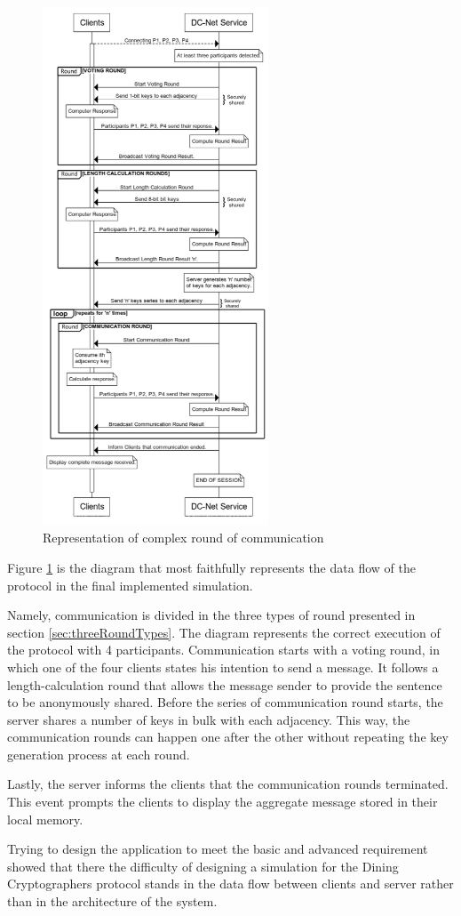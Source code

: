 \begin{figure}[H]
    \centering
    \includegraphics[width=0.6\textwidth]{Images/Design/longRound.png}
    \caption{Representation of complex round of communication}
    \label{fig:longRound}
\end{figure}

Figure \ref{fig:longRound} is the diagram that most faithfully represents the data flow of the protocol in the final implemented simulation. 

Namely, communication is divided in the three types of round presented in section \ref{sec:threeRoundTypes}. The diagram represents the correct execution of the protocol with 4 participants. Communication starts with a voting round, in which one of the four clients states his intention to send a message. It follows a length-calculation round that allows the message sender to provide the sentence to be anonymously shared. Before the series of communication round starts, the server shares a number of keys in bulk with each adjacency. This way, the communication rounds can happen one after the other without repeating the key generation process at each round.

Lastly, the server informs the clients that the communication rounds terminated. This event prompts the clients to display the aggregate message stored in their local memory. \newline 


Trying to design the application to meet the basic and advanced requirement showed that there the difficulty of designing a simulation for the Dining Cryptographers protocol stands in the data flow between clients and server rather than in the architecture of the system.